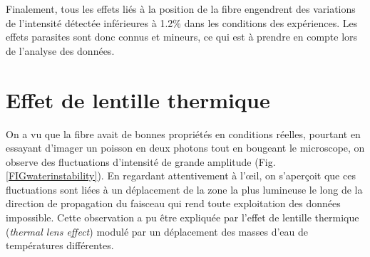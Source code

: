 Finalement, tous les effets liés à la position de la fibre engendrent des variations de l'intensité détectée inférieures à 1.2\% dans les conditions des expériences. Les effets parasites sont donc connus et mineurs, ce qui est à prendre en compte lors de l'analyse des données.




\section{Effet de lentille thermique}


On a vu que la fibre avait de bonnes propriétés en conditions réelles, pourtant en essayant d'imager un poisson en deux photons tout en bougeant le microscope, on observe des fluctuations d'intensité de grande amplitude (Fig. \ref{FIGwaterinstability}). En regardant attentivement à l'œil, on s'aperçoit que ces fluctuations sont liées à un déplacement de la zone la plus lumineuse le long de la direction de propagation du faisceau qui rend toute exploitation des données impossible. Cette observation a pu être expliquée par l'effet de lentille thermique (\emph{thermal lens effect}) modulé par un déplacement des masses d'eau de températures différentes.

